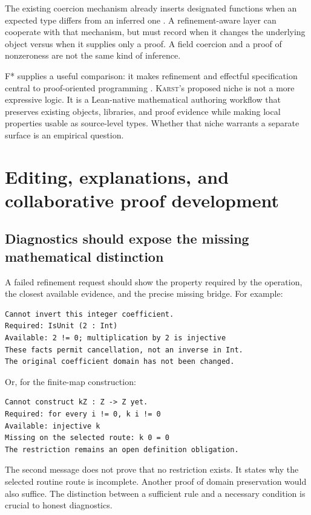 \documentclass[11pt,letterpaper]{article}
\newcommand{\Karst}{\textsc{Karst}}
\theoremstyle{remark}
\begin{document}
The existing coercion mechanism already inserts designated functions when an
expected type differs from an inferred one \cite{leancoercions}. A
refinement-aware layer can cooperate with that mechanism, but must record
when it changes the underlying object versus when it supplies only a proof.
A field coercion and a proof of nonzeroness are not the same kind of inference.

F* supplies a useful comparison: it makes refinement and effectful
specification central to proof-oriented programming \cite{fstarintro,fstarref}.
\Karst's proposed niche is not a more expressive logic. It is a Lean-native
mathematical authoring workflow that preserves existing objects, libraries,
and proof evidence while making local properties usable as source-level types.
Whether that niche warrants a separate surface is an empirical question.

\section{Editing, explanations, and collaborative proof development}\label{sec:editing}

\subsection{Diagnostics should expose the missing mathematical distinction}
A failed refinement request should show the property required by the operation,
the closest available evidence, and the precise missing bridge. For example:
\begin{lstlisting}[caption={A proposed diagnostic, not output of an implemented tool.}]
Cannot invert this integer coefficient.
Required: IsUnit (2 : Int)
Available: 2 != 0; multiplication by 2 is injective
These facts permit cancellation, not an inverse in Int.
The original coefficient domain has not been changed.
\end{lstlisting}

Or, for the finite-map construction:
\begin{lstlisting}[caption={A domain-preservation diagnostic.}]
Cannot construct kZ : Z -> Z yet.
Required: for every i != 0, k i != 0
Available: injective k
Missing on the selected route: k 0 = 0
The restriction remains an open definition obligation.
\end{lstlisting}

The second message does not prove that no restriction exists. It states why
the selected routine route is incomplete. Another proof of domain preservation
would also suffice. The distinction between a sufficient rule and a necessary
condition is crucial to honest diagnostics.
\end{document}
